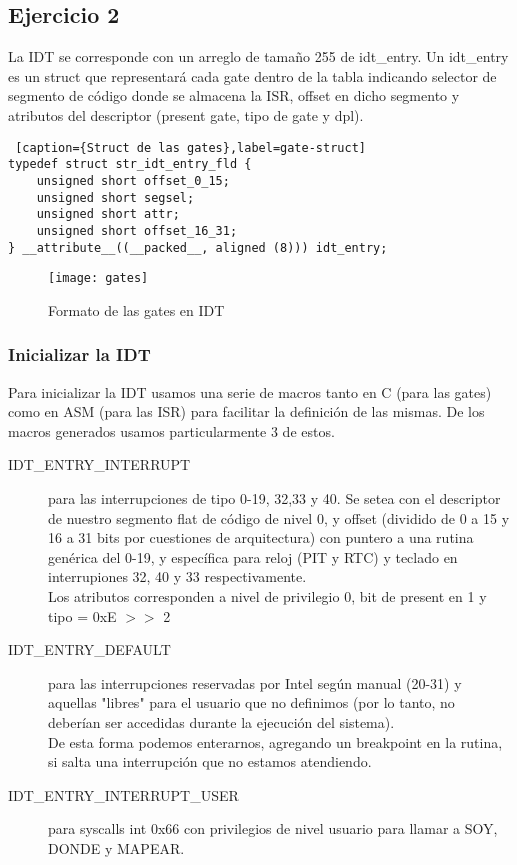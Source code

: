 \subsection{Ejercicio 2}

La IDT se corresponde con un arreglo de tamaño 255 de idt_entry. Un idt_entry es un struct que representará cada gate dentro de la tabla indicando selector de segmento de código donde se almacena la ISR, offset en dicho segmento y atributos del descriptor (present gate, tipo de gate y dpl). 

\begin{lstlisting} [caption={Struct de las gates},label=gate-struct]
typedef struct str_idt_entry_fld {
    unsigned short offset_0_15;
    unsigned short segsel;
    unsigned short attr;
    unsigned short offset_16_31;
} __attribute__((__packed__, aligned (8))) idt_entry;
\end{lstlisting}

\begin{figure}[H]
    \centering
    \texttt{[image: gates]}
    \caption{Formato de las gates en IDT}
    \label{fig:gates}
\end{figure}



\subsubsection{Inicializar la IDT}

Para inicializar la IDT usamos una serie de macros tanto en C (para las gates) como en ASM (para las ISR) para facilitar la definición de las mismas.
De los macros generados usamos particularmente 3 de estos.
\begin{description}
\item [IDT_ENTRY_INTERRUPT] para las interrupciones de tipo 0-19, 32,33 y 40. Se setea con el descriptor de nuestro segmento flat de código de nivel 0, y offset (dividido de 0 a 15 y 16 a 31 bits por cuestiones de arquitectura) con puntero a una rutina genérica del 0-19, y específica para reloj (PIT y RTC) y teclado en interrupiones 32, 40 y 33 respectivamente. \\
Los atributos corresponden a nivel de privilegio 0, bit de present en 1 y tipo = 0xE $>>$ 2
\item [IDT_ENTRY_DEFAULT] para las interrupciones reservadas por Intel según manual (20-31) y aquellas "libres" para el usuario que no definimos (por lo tanto, no deberían ser accedidas durante la ejecución del sistema). \\
De esta forma podemos enterarnos, agregando un breakpoint en la rutina, si salta una interrupción que no estamos atendiendo.
\item [IDT_ENTRY_INTERRUPT_USER] para syscalls int 0x66 con privilegios de nivel usuario para llamar a SOY, DONDE y MAPEAR.
\end{description} 

